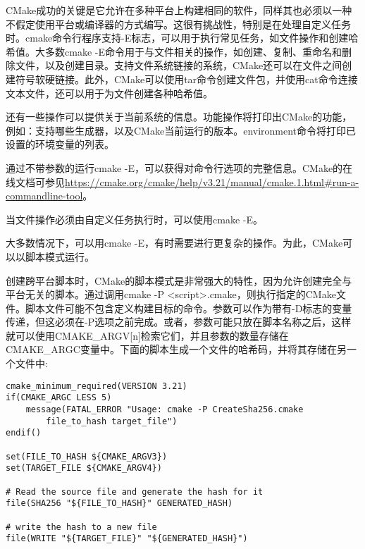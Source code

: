 
CMake成功的关键是它允许在多种平台上构建相同的软件，同样其也必须以一种不假定使用平台或编译器的方式编写。这很有挑战性，特别是在处理自定义任务时。cmake命令行程序支持-E标志，可以用于执行常见任务，如文件操作和创建哈希值。大多数cmake -E命令用于与文件相关的操作，如创建、复制、重命名和删除文件，以及创建目录。支持文件系统链接的系统，CMake还可以在文件之间创建符号软硬链接。此外，CMake可以使用tar命令创建文件包，并使用cat命令连接文本文件，还可以用于为文件创建各种哈希值。

还有一些操作可以提供关于当前系统的信息。功能操作将打印出CMake的功能，例如：支持哪些生成器，以及CMake当前运行的版本。environment命令将打印已设置的环境变量的列表。

通过不带参数的运行cmake -E，可以获得对命令行选项的完整信息。CMake的在线文档可参见\url{https://cmake.org/cmake/help/v3.21/manual/cmake.1.html#run-a-commandline-tool}。

\begin{tcolorbox}[colback=blue!5!white,colframe=blue!75!black,title=平台无关的文件操作]
当文件操作必须由自定义任务执行时，可以使用cmake -E。
\end{tcolorbox}

大多数情况下，可以用cmake -E，有时需要进行更复杂的操作。为此，CMake可以以脚本模式运行。


创建跨平台脚本时，CMake的脚本模式是非常强大的特性，因为允许创建完全与平台无关的脚本。通过调用cmake -P <script>.cmake，则执行指定的CMake文件。脚本文件可能不包含定义构建目标的命令。参数可以作为带有-D标志的变量传递，但这必须在-P选项之前完成。或者，参数可能只放在脚本名称之后，这样就可以使用CMAKE\_ARGV[n]检索它们，并且参数的数量存储在CMAKE\_ARGC变量中。下面的脚本生成一个文件的哈希码，并将其存储在另一个文件中:

\begin{lstlisting}[style=styleCMake]
cmake_minimum_required(VERSION 3.21)
if(CMAKE_ARGC LESS 5)
	message(FATAL_ERROR "Usage: cmake -P CreateSha256.cmake
		file_to_hash target_file")
endif()

set(FILE_TO_HASH ${CMAKE_ARGV3})
set(TARGET_FILE ${CMAKE_ARGV4})

# Read the source file and generate the hash for it
file(SHA256 "${FILE_TO_HASH}" GENERATED_HASH)

# write the hash to a new file
file(WRITE "${TARGET_FILE}" "${GENERATED_HASH}")
\end{lstlisting}

